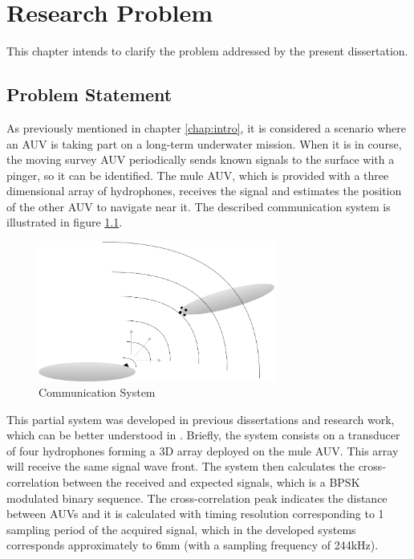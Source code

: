 \chapter{Research Problem} \label{chap:problem}

This chapter intends to clarify the problem addressed by the present dissertation. 

\section{Problem Statement} \label{sec:prob-state}

As previously mentioned in chapter \ref{chap:intro}, it is considered a scenario where an AUV is taking part on a long-term underwater mission. When it is in course, the moving survey AUV periodically sends known signals to the surface with a pinger, so it can be identified. The mule AUV, which is provided with a three dimensional array of hydrophones, receives the signal and estimates the position of the other AUV to navigate near it. The described communication system is illustrated in figure \ref{fig:auv_scene}. 


\begin{figure}[!htbp]
	\centering
	\includegraphics[width=0.7\textwidth]{figures/proposed-solution}
	\caption{Communication System}
	\label{fig:auv_scene}
\end{figure}

This partial system was developed in previous dissertations and research work, which can be better understood in \cite{afonso-thesis}. Briefly, the system consists on a transducer of four hydrophones forming a 3D array deployed on the mule AUV. This array will receive the same signal wave front. The system then calculates the cross-correlation between the received and expected signals, which is a BPSK modulated binary sequence. The cross-correlation peak indicates the distance between AUVs and it is calculated with timing resolution corresponding to 1 sampling period of the acquired signal, which in the developed systems corresponds approximately to 6mm (with a sampling frequency of 244kHz).

